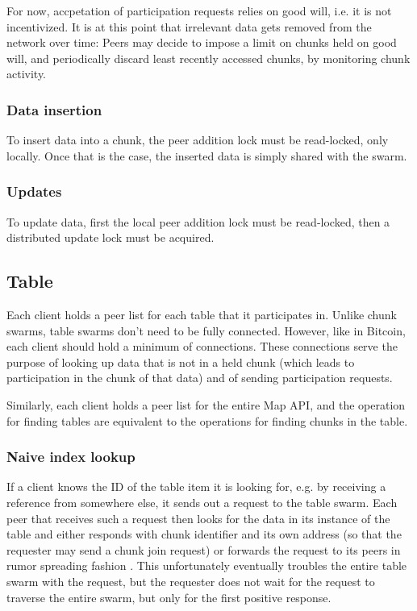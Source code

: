 \documentclass{article}
\begin{document}
For now, accpetation of participation requests relies on good will, i.e. it is 
not incentivized. It is at this point that irrelevant data gets removed from the
network over time: Peers may decide to impose a limit on chunks held on good
will, and periodically discard least recently accessed chunks, by monitoring
chunk activity.

\subsubsection{Data insertion}

To insert data into a chunk, the peer addition lock must be read-locked, only 
locally. Once that is the case, the inserted data is simply shared with the 
swarm.

\subsubsection{Updates}

To update data, first the local peer addition lock must be read-locked, then a 
distributed update lock must be acquired.

\subsection{Table}

Each client holds a peer list for each table that it participates in. Unlike
chunk swarms, table swarms don't need to be fully connected. However, like in
Bitcoin, each client should hold a minimum of connections. These connections
serve the purpose of looking up data that is not in a held chunk (which leads
to participation in the chunk of that data) and of sending participation
requests. 

Similarly, each client holds a peer list for the entire Map API, and the
operation for finding tables are equivalent to the operations for finding
chunks in the table.

\subsubsection{Naive index lookup}

If a client knows the ID of the table item it is looking for, e.g. by receiving
a reference from somewhere else, it sends out a request to the table swarm. Each
peer that receives such a request then looks for the data in its instance of the
table and either responds with chunk identifier and its own address (so that the
requester may send a chunk join request) or forwards the request to its peers in
rumor spreading fashion \cite{bitcoin}. This unfortunately eventually troubles
the entire table swarm with the request, but the requester does not wait for the
request to traverse the entire swarm, but only for the first positive response. 
\end{document}

